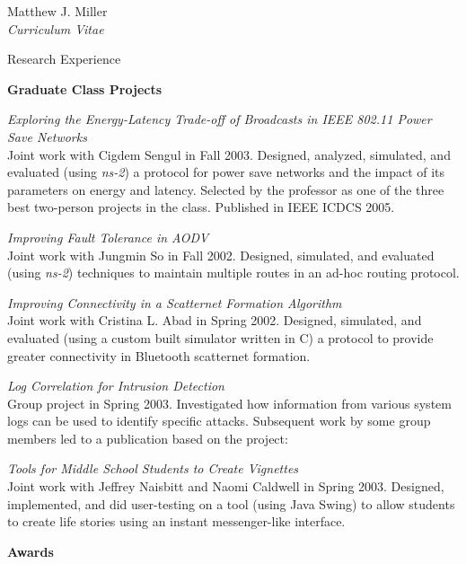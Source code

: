 \documentclass[10pt]{article}
\newenvironment{subbulletlist}{%
    \begin{list}{\labelitemii}{%
        \setlength{\topsep}{\itemsep}\setlength{\parskip}{\parsep}%
    }%
}%
{ \end{list} }
\begin{document}
\begin{cv}{Matthew J. Miller\\{\large \itshape Curriculum Vitae}}
\begin{cvlist}{Research Experience}
    \item \textbf{Graduate Class Projects}
    \begin{subbulletlist}
        \item \textit{Exploring the Energy-Latency Trade-off of Broadcasts
        in IEEE 802.11 Power Save Networks}\\
        Joint work with Cigdem Sengul in Fall 2003.  
        Designed, analyzed, simulated, and evaluated (using \textit{ns-2}) 
        a protocol for power save networks and the 
        impact of its parameters on energy and latency.  Selected by the
        professor as one of the three best two-person projects in the
        class.  Published in IEEE ICDCS 2005.
        \item \textit{Improving Fault Tolerance in AODV}\\
        Joint work with Jungmin So in Fall 2002.  Designed, simulated,
        and evaluated (using \textit{ns-2})
        techniques to maintain multiple routes in an ad-hoc routing protocol.
        \item \textit{Improving Connectivity in a Scatternet Formation
        Algorithm}\\
        Joint work with Cristina L. Abad in Spring 2002.  Designed,
        simulated, and evaluated (using a custom built simulator written
        in C) a protocol to provide greater
        connectivity in Bluetooth scatternet formation. 
        \item \textit{Log Correlation for Intrusion Detection}\\
        Group project in Spring 2003.  Investigated how information 
        from various system
        logs can be used to identify specific attacks.  Subsequent work 
        by some group members led to a publication based on the
        project:  
        \renewcommand*{\biblabelsep}{1.5em}
        \item \textit{Tools for Middle School Students to Create Vignettes}\\
        Joint work with Jeffrey Naisbitt and Naomi Caldwell in Spring
        2003.  Designed, implemented, and did user-testing on a
        tool (using Java Swing) to allow students to create life 
        stories using an instant messenger-like interface.
    \end{subbulletlist}
    \item \textbf{Awards}
    \begin{subbulletlist}

\end{subbulletlist}
\end{cvlist}
\end{cv}
\end{document}
